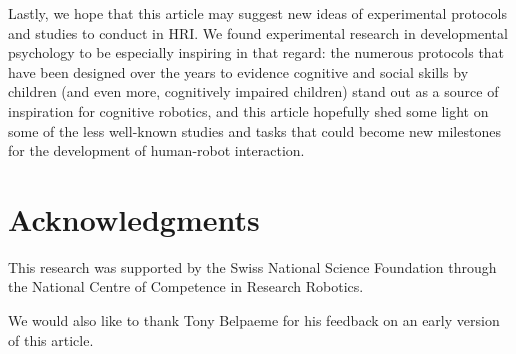 \documentclass{sig-alternate}
\begin{document}
Lastly, we hope that this article may suggest new ideas of experimental
protocols and studies to conduct in HRI. We found experimental research in
developmental psychology to be especially inspiring in that regard: the numerous
protocols that have been designed over the years to evidence cognitive and
social skills by children (and even more, cognitively impaired children) stand
out as a source of inspiration for cognitive robotics,
and this article hopefully shed some light on some of the less well-known
studies and tasks that could become new milestones for the development of
human-robot interaction.


\section*{Acknowledgments}

This research was supported by the Swiss National Science Foundation through the
National Centre of Competence in Research Robotics.

We would also like to thank Tony Belpaeme for his feedback on an early version
of this article.





\end{document}
